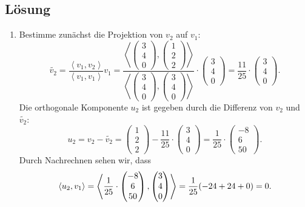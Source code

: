 \documentclass[german,12pt]{homework}
\newcommand{\dotproduct}[2]{\left\langle#1, #2\right\rangle}
\DeclarePairedDelimiter{\enbrace}{(}{)}
\begin{document}
    \subsection*{Lösung}
    \begin{enumerate}
        \item Bestimme zunächst die Projektion von \(v_2\) auf \(v_1\):
        \[\tilde{v_2} = \frac{\dotproduct{v_1}{v_2}}{\dotproduct{v_1}{v_1}}v_1 = \frac{\dotproduct{\begin{pmatrix}3\\4\\0\end{pmatrix}}{\begin{pmatrix}1\\2\\2\end{pmatrix}}}{\dotproduct{\begin{pmatrix}3\\4\\0\end{pmatrix}}{\begin{pmatrix}3\\4\\0\end{pmatrix}}} \cdot \begin{pmatrix}3\\4\\0\end{pmatrix} = \frac{11}{25} \cdot \begin{pmatrix}3\\4\\0\end{pmatrix}.\]
        Die orthogonale Komponente \(u_2\) ist gegeben durch die Differenz von \(v_2\) und \(\tilde{v_2}\):
        \[u_2 = v_2 - \tilde{v_2} = \begin{pmatrix}1\\2\\2\end{pmatrix} - \frac{11}{25} \cdot \begin{pmatrix}3\\4\\0\end{pmatrix} = \frac{1}{25} \cdot \begin{pmatrix}-8\\6\\50\end{pmatrix}.\]
        Durch Nachrechnen sehen wir, dass
        \[\dotproduct{u_2}{v_1} = \dotproduct{\frac{1}{25} \cdot \begin{pmatrix}-8\\6\\50\end{pmatrix}}{\begin{pmatrix}3\\4\\0\end{pmatrix}} = \frac{1}{25}\enbrace*{-24 + 24 + 0} = 0.\]

\end{enumerate}
\end{document}
